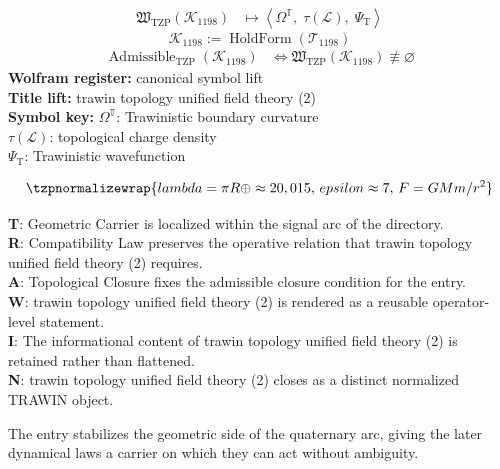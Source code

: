 \noindent
\begin{minipage}[t]{0.48\linewidth}
\begingroup
\small
\[
\begin{aligned}
\mathfrak{W}_{\mathrm{TZP}}\!\left(\mathcal{K}_{1198}\right)
&\longmapsto
\left\langle \Omega^{\mathbb{T}},\; \tau(\mathcal{L}),\; \Psi_{\mathrm{T}} \right\rangle
\end{aligned}
\]
\[
\mathcal{K}_{1198}
:=
\operatorname{HoldForm}\!\left(\mathcal{T}_{1198}\right)
\]
\[
\begin{aligned}
\operatorname{Admissible}_{\mathrm{TZP}}\!\left(\mathcal{K}_{1198}\right)
&\Longleftrightarrow
\mathfrak{W}_{\mathrm{TZP}}\!\left(\mathcal{K}_{1198}\right)\not\equiv\varnothing
\end{aligned}
\]
\textbf{Wolfram register:} canonical symbol lift\\
\textbf{Title lift:} trawin topology unified field theory (2)\\
\textbf{Symbol key:} \(\Omega^{\mathbb{T}}\): Trawinistic boundary curvature\\ \(\tau(\mathcal{L})\): topological charge density\\ \(\Psi_{\mathrm{T}}\): Trawinistic wavefunction
\par
\endgroup
\end{minipage}\hfill
\begin{minipage}[t]{0.48\linewidth}
\[
\tzpnormalizewrap{lambda=\pi R\oplus\approx20,015,\,epsilon\approx7,\,F=GMm/r^{2}}
\]

\small
\textbf{T}: Geometric Carrier is localized within the signal arc of the directory.\\
\textbf{R}: Compatibility Law preserves the operative relation that trawin topology unified field theory (2) requires.\\
\textbf{A}: Topological Closure fixes the admissible closure condition for the entry.\\
\textbf{W}: trawin topology unified field theory (2) is rendered as a reusable operator-level statement.\\
\textbf{I}: The informational content of trawin topology unified field theory (2) is retained rather than flattened.\\
\textbf{N}: trawin topology unified field theory (2) closes as a distinct normalized TRAWIN object.
\normalsize
\end{minipage}

The entry stabilizes the geometric side of the quaternary arc, giving the later dynamical laws a carrier on which they can act without ambiguity.
\clearpage

